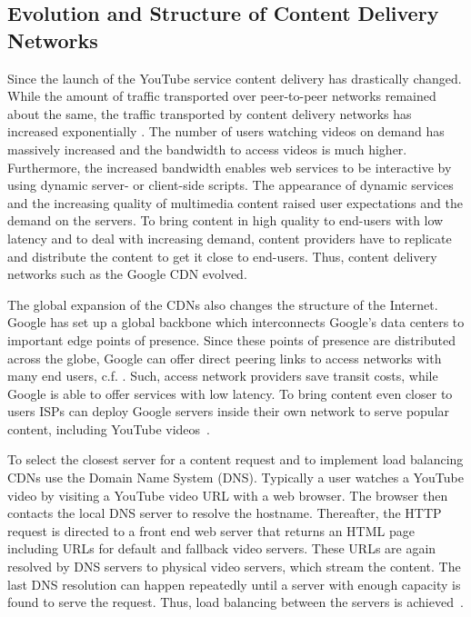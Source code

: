 \subsection{Evolution and Structure of Content Delivery Networks}
Since the launch of the YouTube service content delivery has drastically changed.
While the amount of traffic transported over peer-to-peer networks remained about the same, the traffic transported by content delivery networks has increased exponentially \cite{cisco2016}.
The number of users watching videos on demand has massively increased and the bandwidth to access videos is much higher.
Furthermore, the increased bandwidth enables web services to be interactive by using dynamic server- or client-side scripts.
The appearance of dynamic services and the increasing quality of multimedia content raised user expectations and the demand on the servers.
To bring content in high quality to end-users with low latency and to deal with increasing demand, content providers have to replicate and distribute the content to get it close to end-users.
Thus, content delivery networks such as the Google CDN evolved.

The global expansion of the CDNs also changes the structure of the Internet.
Google has set up a global backbone which interconnects Google's data centers to important edge points of presence.
Since these points of presence are distributed across the globe, Google can offer direct peering links to access networks with many end users, c.f. .
Such, access network providers save transit costs, while Google is able to offer services with low latency.
To bring content even closer to users ISPs can deploy Google servers inside their own network to serve popular content, including YouTube videos~\cite{gcc}.

To select the closest server for a content request and to implement load balancing CDNs use the Domain Name System (DNS).
Typically a user watches a YouTube video by visiting a YouTube video URL with a web browser.
The browser then contacts the local DNS server to resolve the hostname.
Thereafter, the HTTP request is directed to a front end web server that returns an HTML page including URLs for default and fallback video servers.
These URLs are again resolved by DNS servers to physical video servers, which stream the content.
The last DNS resolution can happen repeatedly until a server with enough capacity is found to serve the request.
Thus, load balancing between the servers is achieved~\cite{adhikari2012vivisecting}.

